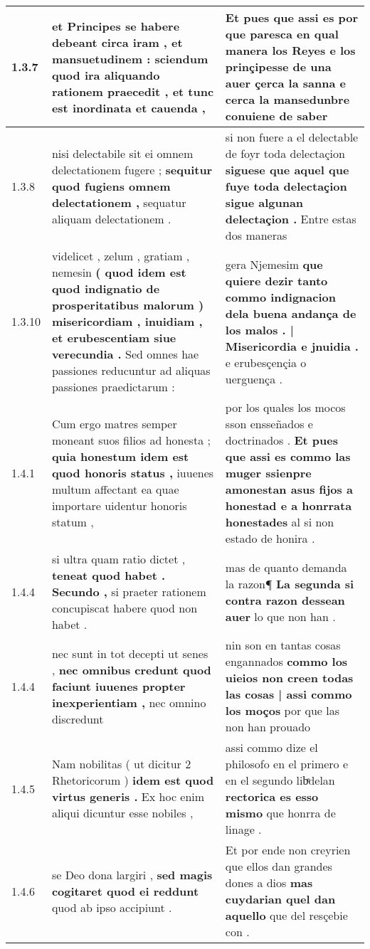 \begin{tabular}{|p{1cm}|p{6.5cm}|p{6.5cm}|}
1.3.7 & et Principes se habere debeant circa iram , et mansuetudinem : \textbf{ sciendum quod ira aliquando rationem praecedit , } et tunc est inordinata et cauenda , & Et pues que assi es \textbf{ por que paresca en qual manera los Reyes e los prinçipesse de una auer çerca la sanna } e cerca la mansedunbre conuiene de saber \\\hline
1.3.8 & nisi delectabile sit ei omnem delectationem fugere ; \textbf{ sequitur quod fugiens omnem delectationem , } sequatur aliquam delectationem . & si non fuere a el delectable de foyr toda delectaçion \textbf{ siguese que aquel que fuye toda delectaçion sigue algunan delectaçion . } Entre estas dos maneras \\\hline
1.3.10 & videlicet , zelum , gratiam , nemesin \textbf{ ( quod idem est quod indignatio de prosperitatibus malorum ) misericordiam , inuidiam , et erubescentiam siue verecundia . } Sed omnes hae passiones reducuntur ad aliquas passiones praedictarum : & gera Njemesim \textbf{ que quiere dezir tanto commo indignacion dela buena andança de los malos . | Misericordia e jnuidia . } e erubesçençia o uerguença . \\\hline
1.4.1 & Cum ergo matres semper moneant suos filios ad honesta ; \textbf{ quia honestum idem est quod honoris status , } iuuenes multum affectant ea quae importare uidentur honoris statum , & por los quales los mocos sson ensseñados e doctrinados . \textbf{ Et pues que assi es commo las muger ssienpre amonestan asus fijos a honestad e a honrrata honestades } al si non estado de honira . \\\hline
1.4.4 & si ultra quam ratio dictet , \textbf{ teneat quod habet . Secundo , } si praeter rationem concupiscat habere quod non habet . & mas de quanto demanda la razon¶ \textbf{ La segunda si contra razon dessean auer } lo que non han . \\\hline
1.4.4 & nec sunt in tot decepti ut senes , \textbf{ nec omnibus credunt quod faciunt iuuenes propter inexperientiam , } nec omnino discredunt & nin son en tantas cosas engannados \textbf{ commo los uieios non creen todas las cosas | assi commo los moços } por que las non han prouado \\\hline
1.4.5 & Nam nobilitas ( ut dicitur 2 Rhetoricorum ) \textbf{ idem est quod virtus generis . } Ex hoc enim aliqui dicuntur esse nobiles , & assi commo dize el philosofo en el primero e en el segundo libͤdelan \textbf{ rectorica es esso mismo } que honrra de linage . \\\hline
1.4.6 & se Deo dona largiri , \textbf{ sed magis cogitaret quod ei reddunt } quod ab ipso accipiunt . & Et por ende non creyrien que ellos dan grandes dones a dios \textbf{ mas cuydarian quel dan aquello } que del resçebie con . \\\hline

\end{tabular}
